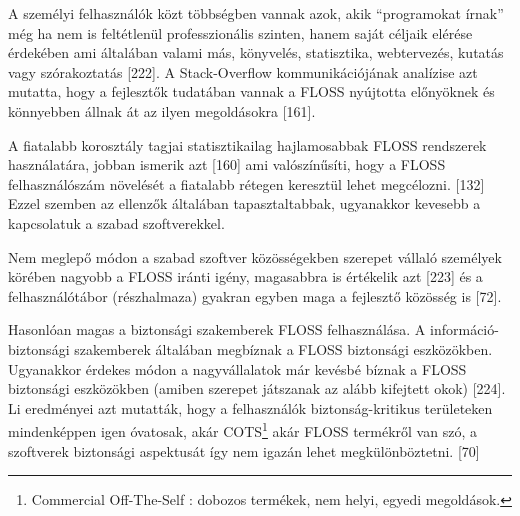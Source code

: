 \documentclass[12pt,magyar,a4paper,oneside]{scrreprt}
\begin{document}
A személyi felhasználók közt többségben vannak azok, akik ``programokat
írnak'' még ha nem is feltétlenül professzionális szinten, hanem saját
céljaik elérése érdekében ami általában valami más, könyvelés,
statisztika, webtervezés, kutatás vagy szórakoztatás {[}222{]}. A
Stack-Overflow kommunikációjának analízise azt mutatta, hogy a
fejlesztők tudatában vannak a FLOSS nyújtotta előnyöknek és könnyebben
állnak át az ilyen megoldásokra {[}161{]}.

A fiatalabb korosztály tagjai statisztikailag hajlamosabbak FLOSS
rendszerek használatára, jobban ismerik azt {[}160{]} ami valószínűsíti,
hogy a FLOSS felhasználószám növelését a fiatalabb rétegen keresztül
lehet megcélozni. {[}132{]} Ezzel szemben az ellenzők általában
tapasztaltabbak, ugyanakkor kevesebb a kapcsolatuk a szabad
szoftverekkel.

Nem meglepő módon a szabad szoftver közösségekben szerepet vállaló
személyek körében nagyobb a FLOSS iránti igény, magasabbra is értékelik
azt {[}223{]} és a felhasználótábor (részhalmaza) gyakran egyben maga a
fejlesztő közösség is {[}72{]}.

Hasonlóan magas a biztonsági szakemberek FLOSS felhasználása. A
információ-biztonsági szakemberek általában megbíznak a FLOSS biztonsági
eszközökben. Ugyanakkor érdekes módon a nagyvállalatok már kevésbé
bíznak a FLOSS biztonsági eszközökben (amiben szerepet játszanak az
alább kifejtett okok) {[}224{]}. Li eredményei azt mutatták, hogy a
felhasználók biztonság-kritikus területeken mindenképpen igen óvatosak,
akár COTS\footnote{Commercial Off-The-Self : dobozos termékek, nem
  helyi, egyedi megoldások.} akár FLOSS termékről van szó, a szoftverek
biztonsági aspektusát így nem igazán lehet megkülönböztetni. {[}70{]}
\end{document}

